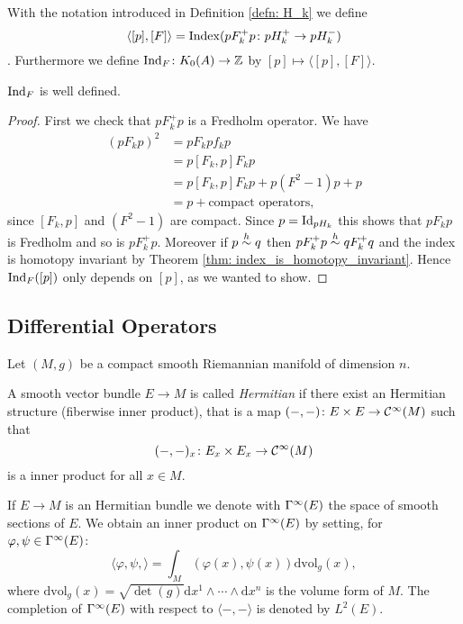 \begin{definition}
 With the notation introduced in Definition \eqref{defn: H_k} we define $$\langle [p],[F]\rangle=\mathrm{Index}(pF_k^+p\colon pH_k^+\to pH_k^-)$$. Furthermore we define $\mathrm{Ind}_F\colon K_0(A)\to\mathbb{Z}$ by $[p]\mapsto\langle[p],[F]\rangle$.
\end{definition}
\begin{proposition}
 $\mathrm{Ind}_F$ is well defined.
\end{proposition}
\begin{proof}
 First we check that $pF_k^+p$ is a Fredholm operator. We have 
 \begin{align*}
  (pF_kp)^2&=pF_kpf_kp\\&=p[F_k,p]F_kp\\&=p[F_k,p]F_kp+p(F^2-1)p+p\\&=p+\text{compact operators},
 \end{align*}
since $[F_k,p]$ and $(F^2-1)$ are compact. Since $p=\mathrm{Id}_{pH_k}$ this shows that $pF_kp$ is Fredholm and so is $pF_k^+p$. Moreover if $p\stackrel{h}{\sim} q$ then $pF_k^+p\stackrel{h}{\sim} qF_k^+ q$ and the index is homotopy invariant by Theorem \eqref{thm: index_is_homotopy_invariant}. Hence $\mathrm{Ind}_F([p])$ only depends on $[p]$, as we wanted to show.
\end{proof}

\subsection{Differential Operators}
Let $(M,g)$ be a compact smooth Riemannian manifold of dimension $n$.

\begin{definition}
 A smooth vector bundle $E\to M$ is called \emph{Hermitian} if there exist an Hermitian structure (fiberwise inner product), that is a map $(-,-)\colon E\times E\to \mathcal{C}^{\infty}(M)$ such that $$(-,-)_x\colon E_x\times E_x\to \mathcal{C}^\infty(M)$$ is a inner product for all $x\in M$.
\end{definition}

\begin{definition}
 If $E\to M$ is an Hermitian bundle we denote with $\Gamma^\infty(E)$ the space of smooth sections of $E$. We obtain an inner product on $\Gamma^\infty(E)$ by setting, for $\varphi,\psi\in\Gamma^\infty(E)$:$$\langle\varphi,\psi,\rangle=\int_M(\varphi(x),\psi(x))\mathrm{dvol}_g(x),$$ where $\mathrm{dvol}_g(x)=\sqrt{\det(g)}\mathrm{d}x^1\wedge\cdots\wedge\mathrm{d}x^n$ is the volume form of $M$. The completion of $\Gamma^\infty(E)$ with respect to $\langle -,-\rangle$ is denoted by $L^2(E)$.
\end{definition}

